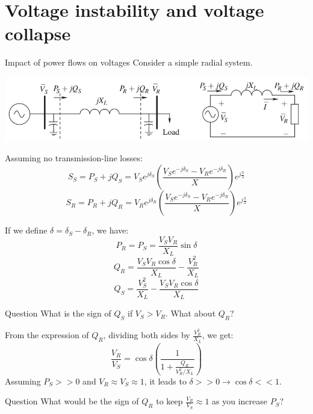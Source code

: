 \section{Voltage instability and voltage collapse}

\begin{frame}[allowframebreaks]{Impact of power flows on voltages}
Consider a simple radial system.
\vspace{0.5cm}
\begin{center}
\includegraphics[width=\textwidth]{images/RadialSystem.png}
\end{center}
Assuming no transmission-line losses:
$$S_S = P_S + jQ_S = V_S e^{j \delta_S} \left(\frac{V_S e^{-j \delta_S} - V_R e^{-j \delta_R}}{X}\right) e^{j\frac{\pi}{2}}$$
$$S_R = P_R + jQ_R = V_R e^{j \delta_R} \left(\frac{V_S e^{-j \delta_S} - V_R e^{-j \delta_R}}{X}\right) e^{j\frac{\pi}{2}}$$


If we define $\delta = \delta_S-\delta_R$, we have:
$$P_R = P_S = \frac{V_S V_R}{X_L}\sin \delta$$
$$Q_{R} = \frac{V_S V_R \cos \delta}{X_L} - \frac{V^2_R}{X_L}$$
$$Q_{S} = \frac{V_S^2}{X_L} - \frac{V_S V_R \cos \delta}{X_L}$$


\begin{block}{Question}
     What is the sign of $Q_S$ if $V_S>V_R$. What about $Q_R$?
\end{block}

From the expression of $Q_{R}$, dividing both sides by $\frac{V_R^2}{X_L}$, we get:
$$\frac{V_R}{V_S} = \cos \delta \left(\frac{1}{1+\frac{Q_R}{V^2_R/X_L}}\right)$$
Assuming $P_S>>0$ and $V_R \approx V_S \approx 1$, it leads to $\delta >> 0 \rightarrow \cos \delta << 1$.
\begin{block}{Question}
What would be the sign of $Q_R$ to keep $\frac{V_R}{V_S}\approx 1$ as you increase $P_S$?
\end{block}


\end{frame}
